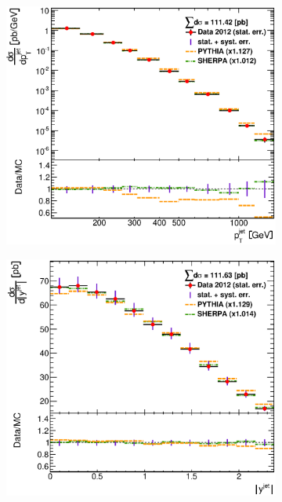 \documentclass[12pt, twoside]{article}
\numberwithin{equation}{section}
\numberwithin{figure}{section}
\newenvironment{changemargin}[2]{%
\begin{list}{}{%
\setlength{\topsep}{0pt}%
\setlength{\leftmargin}{#1}%
\setlength{\rightmargin}{#2}%
\setlength{\listparindent}{\parindent}%
\setlength{\itemindent}{\parindent}%
\setlength{\parsep}{\parskip}%
}%
\item[]}{\end{list}}
\begin{document}
\begin{figure}
\begin{changemargin}{-1.0cm}{-0.75cm}
\begin{changemargin}{-0.75cm}{-1.0cm}
        \vspace{0.2cm}
        \begin{subfigure}[b]{0.37\textwidth}
            \includegraphics[width=\textwidth]{./images/DifferentialCrossSections/DIFF_CRSS_SEC-104.eps}
            \subcaption{}
            \label{fig:DiffCrossSectPtJet}
        \end{subfigure}
        \begin{subfigure}[b]{0.37\textwidth}
            \includegraphics[width=\textwidth]{./images/DifferentialCrossSections/DIFF_CRSS_SEC-105.eps}

\end{subfigure}
\end{changemargin}
\end{changemargin}
\end{figure}
\end{document}
